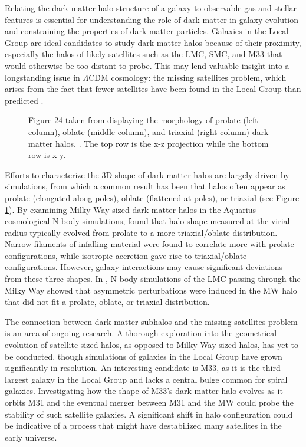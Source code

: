 \documentclass[twocolumn, linenumbers,trackchanges]{aastex7}
\begin{document}
Relating the dark matter halo structure of a galaxy to observable gas and stellar features is essential for understanding the role of dark matter in galaxy evolution and constraining the properties of dark matter particles. Galaxies in the Local Group are ideal candidates to study dark matter halos because of their proximity, especially the halos of likely satellites such as the LMC, SMC, and M33 that would otherwise be too distant to probe. This may lend valuable insight into a longstanding issue in $\Lambda$CDM cosmology: the missing satellites problem, which arises from the fact that fewer satellites have been found in the Local Group than predicted \citep{Kauffmann_1993}. 

\begin{figure}[ht!]
\caption{Figure 24 taken from \cite{Garavito-Camargo_2021} displaying the morphology of prolate (left column), oblate (middle column), and triaxial (right column) dark matter halos.
\label{fig:shapes}. The top row is the x-z projection while the bottom row is x-y.}
\end{figure}

Efforts to characterize the 3D shape of dark matter halos are largely driven by simulations, from which a common result has been that halos often appear as prolate (elongated along poles), oblate (flattened at poles), or triaxial (see Figure \ref{fig:shapes}). By examining Milky Way sized dark matter halos in the Aquarius cosmological N-body simulations, \cite{Vera-Ciro_2011} found that halo shape measured at the virial radius typically evolved from prolate to a more triaxial/oblate distribution. Narrow filaments of infalling material were found to correlate more with prolate configurations, while isotropic accretion gave rise to triaxial/oblate configurations. However, galaxy interactions may cause significant deviations from these three shapes. In \cite{Garavito-Camargo_2021}, N-body simulations of the LMC passing through the Milky Way showed that asymmetric perturbations were induced in the MW halo that did not fit a prolate, oblate, or triaxial distribution.  

The connection between dark matter subhalos and the missing satellites problem is an area of ongoing research. A thorough exploration into the geometrical evolution of satellite sized halos, as opposed to Milky Way sized halos, has yet to be conducted, though simulations of galaxies in the Local Group have grown significantly in resolution. An interesting candidate is M33, as it is the third largest galaxy in the Local Group and lacks a central bulge common for spiral galaxies. Investigating how the shape of M33's dark matter halo evolves as it orbits M31 and the eventual merger between M31 and the MW could probe the stability of such satellite galaxies. A significant shift in halo configuration could be indicative of a process that might have destabilized many satellites in the early universe.  
\end{document}

